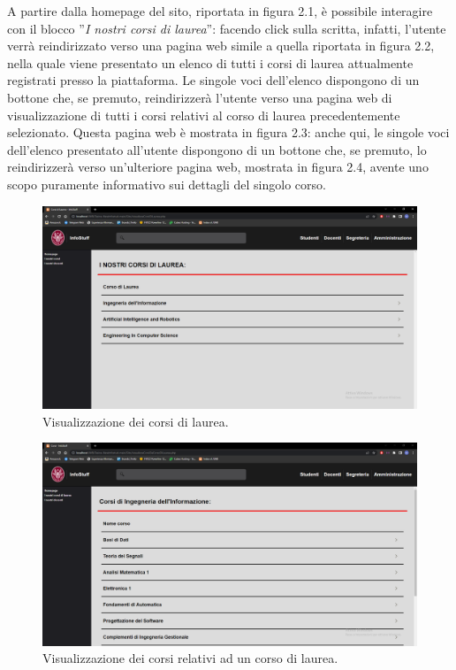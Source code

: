 \documentclass [a4paper,11pt]{book}
\begin{document}
A partire dalla homepage del sito, riportata in figura 2.1, è possibile interagire con il blocco ''\emph{I nostri corsi di laurea}'': facendo click sulla scritta, infatti, l'utente verrà reindirizzato verso una pagina web simile a quella riportata in figura 2.2, nella quale viene presentato un elenco di tutti i corsi di laurea attualmente registrati presso la piattaforma. Le singole voci dell'elenco dispongono di un bottone che, se premuto, reindirizzerà l'utente verso una pagina web di visualizzazione di tutti i corsi relativi al corso di laurea precedentemente selezionato. Questa pagina web è mostrata in figura 2.3: anche qui, le singole voci dell'elenco presentato all'utente dispongono di un bottone che, se premuto, lo reindirizzerà verso un'ulteriore pagina web, mostrata in figura 2.4, avente uno scopo puramente informativo sui dettagli del singolo corso.

\begin{figure}
\centering
\includegraphics[scale=0.3]{figura2-2.png}
\caption{Visualizzazione dei corsi di laurea.}
\end{figure}

\begin{figure}
\centering
\includegraphics[scale=0.3]{figura2-3.png}
\caption{Visualizzazione dei corsi relativi ad un corso di laurea.}
\end{figure}
\end{document}
